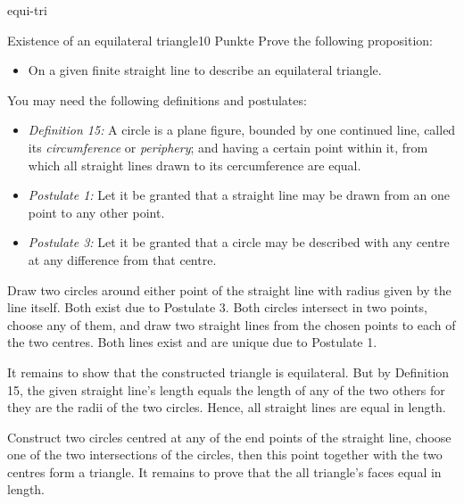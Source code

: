%
%
%
%


{equi-tri}
{
\begin{exercise}{Existence of an equilateral triangle}{10 Punkte}
Prove the following proposition:
\begin{itemize}
	\item On a given finite straight line to describe an equilateral triangle.
\end{itemize}

\begin{infos}
\cite[01-Prop 01]{EE01}
\end{infos}

\begin{material}
You may need the following definitions and postulates:
\begin{itemize}
	\item \emph{Definition 15:} A circle is a plane figure, bounded by one continued line, called its \emph{circumference} or \emph{periphery}; and having a certain point within it, from which all straight lines drawn to its cercumference are equal.
	\item \emph{Postulate 1:} Let it be granted that a straight line may be drawn from an one point to any other point.
	\item \emph{Postulate 3:} Let it be granted that a circle may be described with any centre at any difference from that centre.
\end{itemize}
\end{material}

\begin{solution}
Draw two circles around either point of the straight line with radius given by the line itself. Both exist due to Postulate 3. Both circles intersect in two points, choose any of them, and draw two straight lines from the chosen points to each of the two centres. Both lines exist and are unique due to Postulate 1.

It remains to show that the constructed triangle is equilateral. But by Definition 15, the given straight line's length equals the length of any of the two others for they are the radii of the two circles. Hence, all straight lines are equal in length.
\end{solution}

\begin{sketch}
Construct two circles centred at any of the end points of the straight line, choose one of the two intersections of the circles, then this point together with the two centres form a triangle. It remains to prove that the all triangle's faces equal in length.
\end{sketch}

\end{exercise}
}

